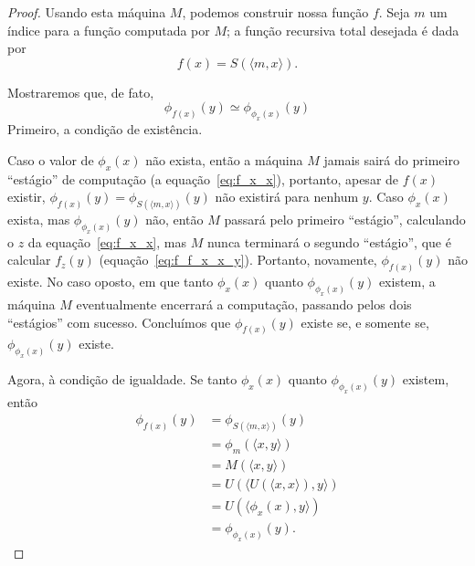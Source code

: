 \begin{proof}
    Usando esta máquina $M$,
    podemos construir nossa função $f$.
    Seja $m$ um índice\footnotemark{} para a função computada por $M$;
    a função recursiva total desejada é dada por
    \begin{equation*}
        f(x) = S(\langle m, x \rangle).
    \end{equation*}

    Mostraremos que,
    de fato,
    \begin{equation*}
        \phi_{f(x)}(y) \simeq \phi_{\phi_x(x)}(y)
    \end{equation*}
    Primeiro, a condição de existência.

    Caso o valor de $\phi_x(x)$ não exista,
    então a máquina $M$ jamais sairá do primeiro ``estágio'' de computação
    (a equação~\ref{eq:f_x_x}),
    portanto,
    apesar de $f(x)$ existir,
    $\phi_{f(x)}(y) = \phi_{S(\langle m, x \rangle)}(y)$
    não existirá para nenhum $y$.
    Caso $\phi_x(x)$ exista,
    mas $\phi_{\phi_x(x)}(y)$ não,
    então $M$ passará pelo primeiro ``estágio'',
    calculando o $z$ da equação~\ref{eq:f_x_x},
    mas $M$ nunca terminará o segundo ``estágio'',
    que é calcular $f_z(y)$ (equação~\ref{eq:f_f_x_x_y}).
    Portanto, novamente,
    $\phi_{f(x)}(y)$ não existe.
    No caso oposto,
    em que tanto $\phi_x(x)$ quanto $\phi_{\phi_x(x)}(y)$ existem,
    a máquina $M$ eventualmente encerrará a computação,
    passando pelos dois ``estágios'' com sucesso.
    Concluímos que $\phi_{f(x)}(y)$ existe se,
    e somente se, $\phi_{\phi_x(x)}(y)$ existe.

    Agora, à condição de igualdade.
    Se tanto $\phi_x(x)$ quanto $\phi_{\phi_x(x)}(y)$ existem, então
    \begin{align*}
        \phi_{f(x)}(y) &= \phi_{S(\langle m, x \rangle)}(y) \\
                       &= \phi_m( \langle x, y \rangle ) \\
                       &= M( \langle x, y \rangle ) \\
                       &= U( \langle U(\langle x, x \rangle), y \rangle ) \\
                       &= U( \langle \phi_x(x), y \rangle ) \\
                       &= \phi_{\phi_x(x)}(y).
    \end{align*}


\end{proof}

